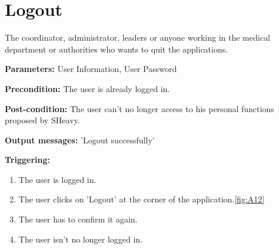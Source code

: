 \section{Logout}
\label{operation:Logout}
The coordinator, administrator, leaders or anyone working in the medical
department or authorities who wants to quit the applications.\\
\begin{description}
\item \textbf{Parameters:} User Information, User Password
\item \textbf{Precondition:} The user is already logged in.
\item \textbf{Post-condition:}  The user can't no longer access to his personal
functions proposed by SHeavy.
\item \textbf{Output messages:} 'Logout successfully'
\item \textbf{Triggering:}
\begin{enumerate}
\item The user is logged in.
\item The user clicks on 'Logout' at the corner of the application.\ref{fig:A12}
\item The user has to confirm it again.
\item The user isn't no longer logged in.
\end{enumerate}
\end{description}

